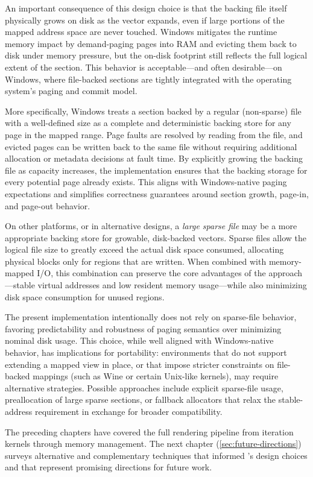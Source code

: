 An important consequence of this design choice is that the backing file itself
physically grows on disk as the vector expands, even if large portions of the
mapped address space are never touched. Windows mitigates the runtime memory
impact by demand-paging pages into RAM and evicting them back to disk under
memory pressure, but the on-disk footprint still reflects the full logical extent
of the section. This behavior is acceptable—and often desirable—on Windows,
where file-backed sections are tightly integrated with the operating system's
paging and commit model.

More specifically, Windows treats a section backed by a regular (non-sparse)
file with a well-defined size as a complete and deterministic backing store for
any page in the mapped range. Page faults are resolved by reading from the file,
and evicted pages can be written back to the same file without requiring
additional allocation or metadata decisions at fault time. By explicitly
growing the backing file as capacity increases, the implementation ensures that
the backing storage for every potential page already exists. This aligns with
Windows-native paging expectations and simplifies correctness guarantees around
section growth, page-in, and page-out behavior.

On other platforms, or in alternative designs, a \emph{large sparse file} may be
a more appropriate backing store for growable, disk-backed vectors. Sparse files
allow the logical file size to greatly exceed the actual disk space consumed,
allocating physical blocks only for regions that are written. When combined with
memory-mapped I/O, this combination can preserve the core advantages of the approach—stable
virtual addresses and low resident memory usage—while also minimizing disk space
consumption for unused regions.

The present implementation intentionally does not rely on sparse-file behavior,
favoring predictability and robustness of paging semantics over minimizing
nominal disk usage. This choice, while well aligned with Windows-native behavior,
has implications for portability: environments that do not support extending a
mapped view in place, or that impose stricter constraints on file-backed mappings
(such as Wine or certain Unix-like kernels), may require alternative strategies.
Possible approaches include explicit sparse-file usage, preallocation of large
sparse sections, or fallback allocators that relax the stable-address requirement
in exchange for broader compatibility.

The preceding chapters have covered the full rendering pipeline from iteration
kernels through memory management.  The next chapter (\cref{sec:future-directions}) surveys alternative and
complementary techniques that informed \FractalShark{}'s design choices and
that represent promising directions for future work.

